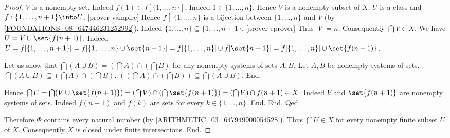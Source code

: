 \begin{forthel}
\begin{proof}
            $V$ is a nonempty set.
            Indeed $f(1) \in f[\{ 1, \dots, n \}]$.
            Indeed $1 \in \{ 1, \dots, n \}$.
            Hence $V$ is a nonempty subset of $X$.
            $U$ is a class and $f : \{ 1, \dots, n + 1 \} \into U$.
            [prover vampire]
            Hence $f \restriction \{ 1, \dots, n \}$ is a bijection between
            $\{ 1, \dots, n \}$ and $V$
            (by \cref{FOUNDATIONS_08_647446231252992}).
            Indeed $\{ 1, \dots, n \} \subseteq \{ 1, \dots, n + 1 \}$.
            [prover eprover]
            Thus $|V| = n$.
            Consequently $\bigcap V \in X$.
            We have $U = V \cup \set{f(n + 1)}$.
            Indeed $U = f[\{ 1, \dots, n + 1 \}]
              = f[\{ 1, \dots, n \} \cup \set{n + 1}]
              = f[\{ 1, \dots, n \}] \cup f[\set{n + 1}]
              = f[\{ 1, \dots, n \}] \cup \set{f(n + 1)}$.

            Let us show that $\bigcap (A \cup B) =
            (\bigcap A) \cap (\bigcap B)$ for any nonempty systems of sets
            $A, B$.
              Let $A, B$ be nonempty systems of sets.
              $\bigcap (A \cup B) \subseteq (\bigcap A) \cap (\bigcap B)$.
              $((\bigcap A) \cap (\bigcap B)) \subseteq \bigcap (A \cup B)$. %
            End.

            Hence $\bigcap U
              = \bigcap (V \cup \set{f(n + 1)})
              = (\bigcap V) \cap (\bigcap \set{f(n + 1)})
              = (\bigcap V) \cap f(n + 1)
              \in X$.
            Indeed $V$ and $\set{f(n + 1)}$ are nonempty systems of sets.
            Indeed $f(n + 1)$ and $f(k)$ are sets for every $k \in \{ 1, \dots, n \}$.
          End.
        End.
      Qed.

      Therefore $\Phi$ contains every natural number (by \cref{ARITHMETIC_03_647949900054528}).
      Thus $\bigcap U \in X$ for every nonempty finite subset $U$ of $X$.
      Consequently $X$ is closed under finite intersections.
    End.
  \end{proof}
\end{forthel}
